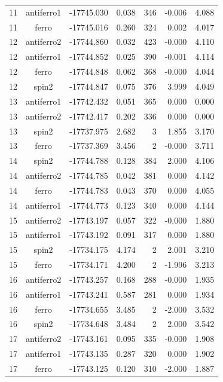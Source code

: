 \begin{longtable}{@{}ccrrrrr@{}}
11 & antiferro1 & -17745.030 & 0.038 & 346 & -0.006 & 4.088 \\
11 & ferro & -17745.016 & 0.260 & 324 & 0.002 & 4.017 \\
\rowcolor{gray!20} 12 & antiferro2 & -17744.860 & 0.032 & 423 & -0.000 & 4.110 \\
12 & antiferro1 & -17744.852 & 0.025 & 390 & -0.001 & 4.114 \\
12 & ferro & -17744.848 & 0.062 & 368 & -0.000 & 4.044 \\
12 & spin2 & -17744.847 & 0.075 & 376 & 3.999 & 4.049 \\
\rowcolor{gray!20} 13 & antiferro1 & -17742.432 & 0.051 & 365 & 0.000 & 0.000 \\
13 & antiferro2 & -17742.417 & 0.202 & 336 & 0.000 & 0.000 \\
13 & spin2 & -17737.975 & 2.682 & 3 & 1.855 & 3.170 \\
13 & ferro & -17737.369 & 3.456 & 2 & -0.000 & 3.711 \\
\rowcolor{gray!20} 14 & spin2 & -17744.788 & 0.128 & 384 & 2.000 & 4.106 \\
14 & antiferro2 & -17744.785 & 0.042 & 381 & 0.000 & 4.142 \\
14 & ferro & -17744.783 & 0.043 & 370 & 0.000 & 4.055 \\
14 & antiferro1 & -17744.773 & 0.123 & 340 & 0.000 & 4.144 \\
\rowcolor{gray!20} 15 & antiferro2 & -17743.197 & 0.057 & 322 & -0.000 & 1.880 \\
15 & antiferro1 & -17743.192 & 0.091 & 317 & 0.000 & 1.880 \\
15 & spin2 & -17734.175 & 4.174 & 2 & 2.001 & 3.210 \\
15 & ferro & -17734.171 & 4.200 & 2 & -1.996 & 3.213 \\
\rowcolor{gray!20} 16 & antiferro2 & -17743.257 & 0.168 & 288 & -0.000 & 1.935 \\
16 & antiferro1 & -17743.241 & 0.587 & 281 & 0.000 & 1.934 \\
16 & ferro & -17734.655 & 3.485 & 2 & -2.000 & 3.532 \\
16 & spin2 & -17734.648 & 3.484 & 2 & 2.000 & 3.542 \\
\rowcolor{gray!20} 17 & antiferro2 & -17743.161 & 0.095 & 335 & -0.000 & 1.908 \\
17 & antiferro1 & -17743.135 & 0.287 & 320 & 0.000 & 1.902 \\
17 & ferro & -17743.125 & 0.120 & 310 & -2.000 & 1.887 \\

\end{longtable}
